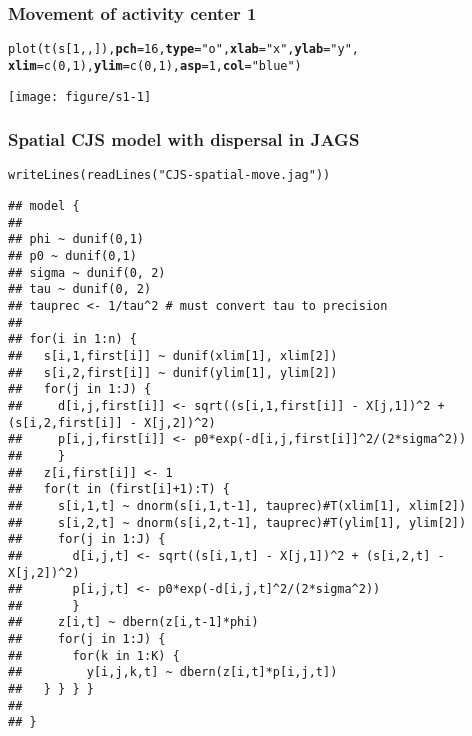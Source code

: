 \documentclass[color=usenames,dvipsnames]{beamer}\usepackage[]{graphicx}\usepackage[]{color}
\makeatletter
\newcommand{\hlnum}[1]{\textcolor[rgb]{0.69,0.494,0}{#1}}%
\newcommand{\hlstr}[1]{\textcolor[rgb]{0.749,0.012,0.012}{#1}}%
\newcommand{\hlstd}[1]{\textcolor[rgb]{0,0,0}{#1}}%
\newcommand{\hlkwc}[1]{\textcolor[rgb]{0,0,0}{\textbf{#1}}}%
\newcommand{\hlkwd}[1]{\textcolor[rgb]{0.004,0.004,0.506}{#1}}%
\newenvironment{kframe}{%
 \def\at@end@of@kframe{}%
 \ifinner\ifhmode%
  \def\at@end@of@kframe{\end{minipage}}%
  \begin{minipage}{\columnwidth}%
 \fi\fi%
 \def\FrameCommand##1{\hskip\@totalleftmargin \hskip-\fboxsep
 \colorbox{shadecolor}{##1}\hskip-\fboxsep
     \hskip-\linewidth \hskip-\@totalleftmargin \hskip\columnwidth}%
 \MakeFramed {\advance\hsize-\width
   \@totalleftmargin\z@ \linewidth\hsize
   \@setminipage}}%
 {\par\unskip\endMakeFramed%
 \at@end@of@kframe}
\newenvironment{knitrout}{}{} %
\makeatother
\begin{document}
\begin{frame}[fragile]
  \frametitle{Movement of activity center 1}
\begin{knitrout}\scriptsize
{}\color{fgcolor}\begin{kframe}
\begin{alltt}
\hlkwd{plot}\hlstd{(}\hlkwd{t}\hlstd{(s[}\hlnum{1}\hlstd{,,]),} \hlkwc{pch}\hlstd{=}\hlnum{16}\hlstd{,} \hlkwc{type}\hlstd{=}\hlstr{"o"}\hlstd{,} \hlkwc{xlab}\hlstd{=}\hlstr{"x"}\hlstd{,} \hlkwc{ylab}\hlstd{=}\hlstr{"y"}\hlstd{,}
     \hlkwc{xlim}\hlstd{=}\hlkwd{c}\hlstd{(}\hlnum{0}\hlstd{,} \hlnum{1}\hlstd{),} \hlkwc{ylim}\hlstd{=}\hlkwd{c}\hlstd{(}\hlnum{0}\hlstd{,} \hlnum{1}\hlstd{),} \hlkwc{asp}\hlstd{=}\hlnum{1}\hlstd{,} \hlkwc{col}\hlstd{=}\hlstr{"blue"}\hlstd{)}
\end{alltt}
\end{kframe}

{\centering \texttt{[image: figure/s1-1]} 

}



\end{knitrout}
\end{frame}




\begin{frame}[fragile]
  \frametitle{Spatial CJS model with dispersal in JAGS}
  \vspace{-2mm}
  \tiny %
\begin{knitrout}\tiny
{}\color{fgcolor}\begin{kframe}
\begin{alltt}
\hlkwd{writeLines}\hlstd{(}\hlkwd{readLines}\hlstd{(}\hlstr{"CJS-spatial-move.jag"}\hlstd{))}
\end{alltt}
\begin{verbatim}
## model {
## 
## phi ~ dunif(0,1)
## p0 ~ dunif(0,1)
## sigma ~ dunif(0, 2)
## tau ~ dunif(0, 2)
## tauprec <- 1/tau^2 # must convert tau to precision
## 
## for(i in 1:n) {
##   s[i,1,first[i]] ~ dunif(xlim[1], xlim[2])
##   s[i,2,first[i]] ~ dunif(ylim[1], ylim[2])
##   for(j in 1:J) {
##     d[i,j,first[i]] <- sqrt((s[i,1,first[i]] - X[j,1])^2 + (s[i,2,first[i]] - X[j,2])^2)
##     p[i,j,first[i]] <- p0*exp(-d[i,j,first[i]]^2/(2*sigma^2))
##     }
##   z[i,first[i]] <- 1
##   for(t in (first[i]+1):T) {
##     s[i,1,t] ~ dnorm(s[i,1,t-1], tauprec)#T(xlim[1], xlim[2])
##     s[i,2,t] ~ dnorm(s[i,2,t-1], tauprec)#T(ylim[1], ylim[2])
##     for(j in 1:J) {
##       d[i,j,t] <- sqrt((s[i,1,t] - X[j,1])^2 + (s[i,2,t] - X[j,2])^2)
##       p[i,j,t] <- p0*exp(-d[i,j,t]^2/(2*sigma^2))
##       }
##     z[i,t] ~ dbern(z[i,t-1]*phi)
##     for(j in 1:J) {
##       for(k in 1:K) {
##         y[i,j,k,t] ~ dbern(z[i,t]*p[i,j,t])
##   } } } }
## 
## }
\end{verbatim}
\end{kframe}
\end{knitrout}
\end{frame}
\end{document}
